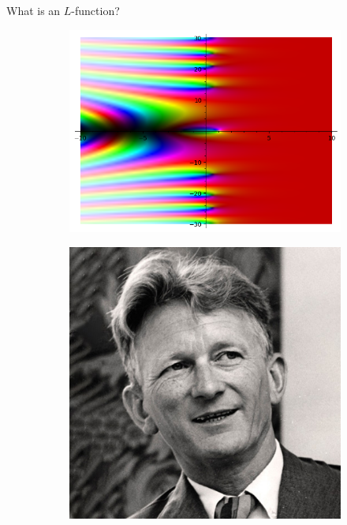 \documentclass[10pt]{beamer}
\begin{document}
\begin{frame}{What is an $L$-function?}
\begin{figure}[H]
\begin{subfigure}[b]{0.3\textwidth}
\includegraphics[width=.9\textwidth]{zeta-plot2.png}
\end{subfigure}
  \begin{subfigure}[b]{0.3\textwidth}
  \centering
\includegraphics[width=.7\textwidth]{Selberg.jpg}
\end{subfigure}
\end{figure}\vspace{-5pt}


\end{frame}
\end{document}
